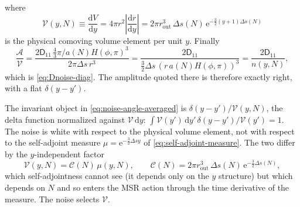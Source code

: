 \documentclass[a4paper,11pt]{article}
\renewcommand{\d}{\mathrm{d}}
\newcommand{\e}[1]{\mathrm{e}^{{#1}}}
\newenvironment{calculation}{\begin{tcolorbox}[enhanced,breakable,colback=SussexPowderBlue!10,colframe=SussexCobaltBlue!30]\small}{\end{tcolorbox}}
\newcommand{\Ny}{N}                          %
\newcommand{\Hub}{H}                         %
\newcommand{\sfactor}{a}                     %
\newcommand{\atloc}{(\field,\mom)}           %
\newcommand{\field}{\phi}                    %
\newcommand{\mom}{\pi}                       %
\newcommand{\rad}{r}                         %
\newcommand{\yco}{y}                         %
\newcommand{\rout}{\rad_{\mathrm{out}}}      %
\newcommand{\aHloc}{\sfactor(\Ny)\Hub\atloc} %
\newcommand{\Deltas}{\Delta s}                %
\newcommand{\measure}{\mu}                   %
\newcommand{\Dcm}[1]{\mathsf{D}_{#1}}        %
\newcommand{\ncount}{n}                      %
\newcommand{\volel}{\mathcal{V}}             %
\newcommand{\Cpref}{\mathcal{C}}             %
\begin{document}
\begin{calculation}
where
\begin{equation}
    \volel(\yco,\Ny) \equiv \frac{\d V}{\d\yco} = 4\pi\rad^2\left|\frac{\d\rad}{\d\yco}\right|
    = 2\pi\rout^3\,\Deltas(\Ny)\,\e{-\frac32(\yco+1)\Deltas(\Ny)}
    \label{eq:volel-definition}
\end{equation}
is the physical comoving volume element per unit $\yco$. Finally
\begin{equation}
    \frac{\mathcal{A}}{\volel}
    = \frac{2\Dcm{11}\,\tfrac43\pi/\aHloc^3}{2\pi\Deltas\,\rad^3}
    = \frac{2\Dcm{11}}{\tfrac32\Deltas\,(\rad\,\aHloc)^3}
    = \frac{2\Dcm{11}}{\ncount(\yco,\Ny)} ,
\end{equation}
which is \eqref{eq:Dnoise-diag}. The amplitude quoted there is therefore
exactly right, with a flat $\delta(\yco-\yco')$.
\end{calculation}

The invariant object in \eqref{eq:noise-angle-averaged} is
$\delta(\yco-\yco')/\volel(\yco,\Ny)$, the delta function normalized
against $\volel\,\d\yco$: $\int\volel(\yco')\,\d\yco'\,\delta(\yco-\yco')/\volel(\yco') = 1$.
The noise is white with respect to the physical volume element, not with
respect to the self-adjoint measure $\measure=\e{-\frac32\Deltas\yco}$ of
\eqref{eq:self-adjoint-measure}. The two differ by the $\yco$-independent
factor
\begin{equation}
    \volel(\yco,\Ny) = \Cpref(\Ny)\,\measure(\yco,\Ny) ,
    \qquad
    \Cpref(\Ny) = 2\pi\rout^3\,\Deltas(\Ny)\,\e{-\frac32\Deltas(\Ny)} ,
    \label{eq:Cpref-definition}
\end{equation}
which self-adjointness cannot see (it depends only on the $\yco$ structure)
but which depends on $\Ny$ and so enters the MSR action through the time
derivative of the measure. The noise selects $\volel$.
\end{document}
